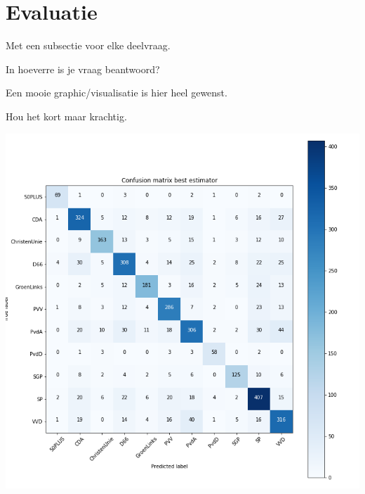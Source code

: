\section{Evaluatie}
\label{sec:eva}

Met een subsectie voor elke deelvraag.

In hoeverre is je vraag beantwoord?

Een mooie graphic/visualisatie is hier heel gewenst.

Hou het kort maar krachtig.


\includegraphics[width=0.6\paperwidth]{Verslag/confusionmatrix.png}